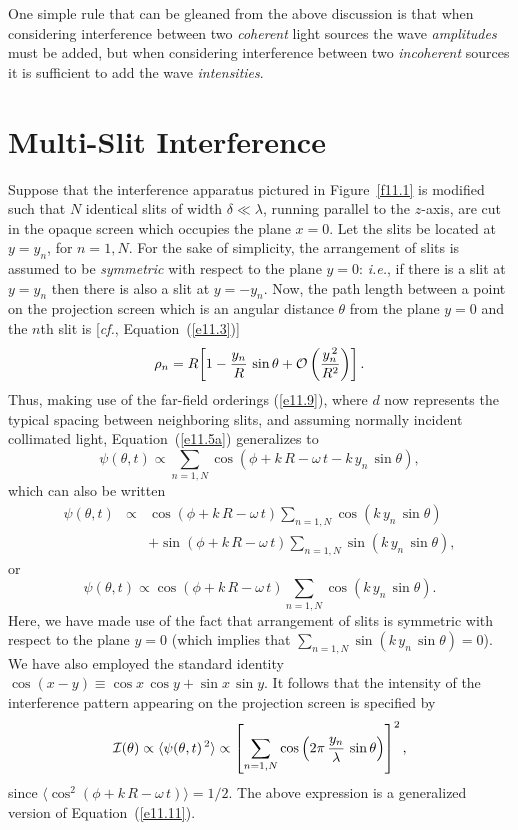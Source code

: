 One simple rule that can be gleaned from the above discussion is that when considering interference between two
{\em coherent}\/ light sources the wave {\em amplitudes}\/ must be added,  but when considering interference between two
{\em incoherent}\/  sources it is sufficient to add the wave {\em intensities}. 

\section{Multi-Slit Interference}\label{s11.4}
Suppose that the interference apparatus pictured in Figure~\ref{f11.1} is modified such that $N$ identical   slits  of width $\delta\ll \lambda$,
running parallel to the $z$-axis, are cut in the
opaque screen which occupies the plane $x=0$. Let the slits be located at $y=y_n$, for $n=1,N$.  For the sake of
simplicity, the arrangement of slits is assumed to
be {\em symmetric}\/ with respect to the  plane $y=0$: {\em i.e.}, if there is a slit at $y=y_n$ then there is also
a slit at $y=-y_n$. 
 Now, the path length between a 
point on the projection screen which is an angular distance $\theta$ from the  plane $y=0$ and the $n$th slit
is [{\em cf.}, Equation~(\ref{e11.3})]
\begin{equation}
\rho_n = R\!\left[1-\frac{y_n}{R}\,\sin\theta + {\cal O}\left(\frac{y_n^{\,2}}{R^2}\right)\right].
\end{equation}
Thus, making use of the far-field
orderings (\ref{e11.9}), where $d$ now represents the typical  spacing between neighboring slits, 
and assuming normally incident collimated light, Equation~(\ref{e11.5a}) generalizes to
\begin{equation}
\psi(\theta,t)\propto \sum_{n=1,N}\cos(\phi+k\,R-\omega\,t-k\,y_n\,\sin\theta),
\end{equation}
which can also be written
\begin{eqnarray}
\psi(\theta,t)&\propto& \cos(\phi+k\,R-\omega\,t)\sum_{n=1,N} \cos(k\,y_n\,\sin\theta)\nonumber\\[0.5ex]
&&+ \sin(\phi+k\,R-\omega\,t)\sum_{n=1,N}\sin(k\,y_n\,\sin\theta),
\end{eqnarray}
or
\begin{equation}
\psi(\theta,t)\propto \cos(\phi+k\,R-\omega\,t)\sum_{n=1,N} \cos(k\,y_n\,\sin\theta).
\end{equation}
Here, we have made use of the fact that arrangement of slits is symmetric with respect to the plane
$y=0$ (which implies that $\sum_{n=1,N} \sin(k\,y_n\,\sin\theta)= 0$). We have also employed the standard
identity $\cos(x-y)\equiv \cos x\,\cos y+\sin x\,\sin y$. 
It follows that the intensity of
the interference pattern appearing on the projection screen is specified  by 
\begin{equation}
{\cal I}(\theta) \propto \langle \psi(\theta,t)^{\,2}\rangle \propto \left[\sum_{n=1,N} \cos\left(2\pi\,\frac{y_n}{\lambda}\,\sin\theta\right)\right]^2,
\end{equation}
since $\langle \cos^2(\phi+k\,R-\omega\,t)\rangle=1/2$.
The above expression  is a generalized version of Equation~(\ref{e11.11}). 

